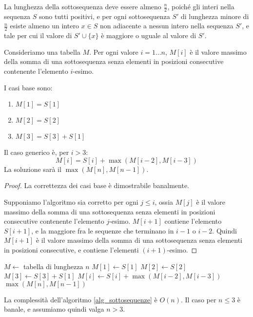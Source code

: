 La lunghezza della sottosequenza deve essere almeno $\frac{n}{2}$, poich\'e gli interi nella sequenza $S$ sono tutti positivi, e per ogni sottosequenza $S'$ di lunghezza minore di $\frac{n}{2}$ esiste almeno un intero $x \in S$ non adiacente a nessun intero nella sequenza $S'$, e tale per cui il valore di $S' \cup \{ x \}$ \`e maggiore o uguale al valore di $S'$.

Consideriamo una tabella $M$. Per ogni valore $i = 1 \ldots n$, $M[i]$ \`e il valore massimo della somma di una sottosequenza senza elementi in posizioni consecutive contenente l'elemento $i$-esimo.

I casi base sono:
\begin{enumerate}
    \item $M[1] = S[1]$
    \item $M[2] = S[2]$
    \item $M[3] = S[3] + S[1]$
\end{enumerate}
Il caso generico \`e, per $i > 3$:
\[
M[i] = S[i] + \max ( M[i-2], M[i-3] )
\]
La soluzione sar\`a il $\max(M[n], M[n-1])$.

\begin{proof}
La correttezza dei casi base \`e dimostrabile banalmente.

Supponiamo l'algoritmo sia corretto per ogni $j \le i$, ossia $M[j]$ \`e il valore massimo della somma di una sottosequenza senza elementi in posizioni consecutive contenente l'elemento $j$-esimo. $M[i+1]$ contiene l'elemento $S[i+1]$, e la maggiore fra le sequenze che terminano in $i-1$ o $i-2$. Quindi $M[i+1]$ \`e il valore massimo della somma di una sottosequenza senza elementi in posizioni consecutive, e contiene l'elementi $(i+1)$-esimo.
\end{proof}

\begin{algorithm}
\begin{algorithmic}
    \State $M \gets$ tabella di lunghezza $n$
    \State $M[1] \gets S[1]$
    \State $M[2] \gets S[2]$
    \State $M[3] \gets S[3] + S[1]$
        \State $M[i] \gets S[i] + \max(M[i-2], M[i-3])$
    \EndFor
    \State \Return $\max (M[n], M[n-1])$
\EndFunction
\end{algorithmic}
\caption{\label{alg_sottosequenze}calcolare il valore di una sottosequenza di somma massima}
\end{algorithm}

La complessit\`a dell'algoritmo \ref{alg_sottosequenze} \`e $O(n)$.  Il caso per $n \le 3$ \`e banale, e assumiamo quindi valga $n > 3$.

